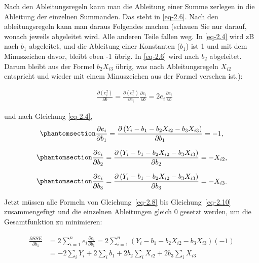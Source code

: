 \documentclass[
  10pt,
  letterpaper,
  a4paper, twoside]{scrreprt}
\begin{document}
\begin{tcolorbox}
Nach den Ableitungsregeln kann man die Ableitung einer Summe zerlegen in
die Ableitung der einzelnen Summanden. Das steht in \eqref{eq-2.6}. Nach
den ableitungsregeln kann man daraus Folgendes machen (schauen Sie nur
darauf, wonach jeweils abgeleitet wird. Alle anderen Teile fallen weg.
In \eqref{eq-2.4} wird zB nach \(b_1\) abgeleitet, und die Ableitung
einer Konstanten (\(b_1\)) ist 1 und mit dem Minuszeichen davor, bleibt
eben -1 übrig. In \eqref{eq-2.6} wird nach \(b_2\) abgeleitet. Darum
bleibt aus der Formel \(b_2X_{i 3}\) übrig, was nach Ableitungsregeln
\(X_{i 2}\) entspricht und wieder mit einem Minuszeichen aus der Formel
versehen ist.):

\begin{align}
& \frac{\partial\left(e_i^2\right)}{\partial b}=\frac{\partial\left(e_i^2\right)}{\partial e_i} \frac{\partial e_i}{\partial b}=2 e_i \frac{\partial e_i}{\partial b} \label{eq-2.7}
\end{align}

und nach Gleichung \eqref{eq-2.4},
\begin{equation}\phantomsection\label{eq-2.8}{
\begin{gathered}
\frac{\partial e_i}{\partial b_1}=\frac{\partial\left(Y_i-b_1-b_2 X_{i 2}-b_3 X_{i 3}\right)}{\partial b_1}=-1, 
\end{gathered}
}\end{equation}

\begin{equation}\phantomsection\label{eq-2.9}{
\begin{gathered}
\frac{\partial e_i}{\partial b_2}=\frac{\partial\left(Y_i-b_1-b_2 X_{i 2}-b_3 X_{i 3}\right)}{\partial b_2}=-X_{i 2}, 
\end{gathered}
}\end{equation}

\begin{equation}\phantomsection\label{eq-2.10}{
\begin{gathered}
\frac{\partial e_i}{\partial b_3}=\frac{\partial\left(Y_i-b_1-b_2 X_{i 2}-b_3 X_{i 3}\right)}{\partial b_3}=-X_{i 3} .
\end{gathered}
}\end{equation}

Jetzt müssen alle Formeln von Gleichung~\ref{eq-2.8} bis
Gleichung~\ref{eq-2.10} zusammengefügt und die einzelnen Ableitungen
gleich 0 gesetzt werden, um die Gesamtfunktion zu minimieren:

\begin{align}
\frac{\partial S S E}{\partial b_1} & =2 \sum_{i=1}^n e_i \frac{\partial e_i}{\partial b_1}=2 \sum_{i=1}^n\left(Y_i-b_1-b_2 X_{i 2}-b_3 X_{i 3}\right)(-1) \\
& =-2 \sum_i Y_i+2 \sum_i b_1+2 b_2 \sum_i X_{i 2}+2 b_3 \sum_i X_{i 3}
\end{align}


\end{tcolorbox}
\end{document}
